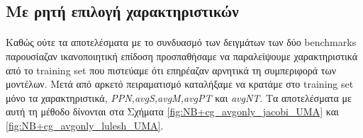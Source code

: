 \subsection{Με ρητή επιλογή χαρακτηριστικών}
\paragraph{}
Καθώς ούτε τα αποτελέσματα με το συνδυασμό των δειγμάτων των δύο benchmarks παρουσίαζαν ικανοποιητική επίδοση προσπαθήσαμε να παραλείψουμε χαρακτηριστικά από το training set που πιστεύαμε ότι επηρέαζαν αρνητικά τη συμπεριφορά των μοντέλων. Μετά από αρκετό πειραματισμό καταλήξαμε να κρατάμε στο training set μόνο τα χαρακτηριστικά, \textit{PPN,avgS,avgM,avgPT} και \textit{avgNT}. Τα αποτελέσματα με αυτή τη μέθοδο δίνονται στα Σχήματα \ref{fig:NB+cg_avgonly_jacobi_UMA} και \ref{fig:NB+cg_avgonly_lulesh_UMA}.

